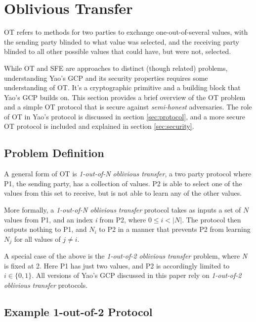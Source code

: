 \section{Oblivious Transfer}
\label{sec:ot}

\ac{OT} refers to methods for two parties to exchange one-out-of-several values, with the sending party blinded to what value was selected, and the receiving party blinded to all other possible values that could have, but were not, selected.

While \ac{OT} and \ac{SFE} are approaches to distinct (though related) problems, understanding Yao's \ac{GCP} and its security properties requires some understanding of \ac{OT}. It's a cryptographic primitive and a building block that Yao's \ac{GCP} builds on.  This section provides a brief overview of the \ac{OT} problem and a simple \ac{OT} protocol that is secure against \emph{semi-honest} adversaries. The role of \ac{OT} in Yao's protocol is discussed in section \ref{sec:protocol}, and a more secure \ac{OT} protocol is included and explained in section \ref{sec:security}.

\subsection{Problem Definition}

A general form of \ac{OT} is \emph{1-out-of-N oblivious transfer}, a two party protocol where \ac{P1}, the sending party, has a collection of values. \ac{P2} is able to select one of the values from this set to receive, but is not able to learn any of the other values.

More formally, a \emph{1-out-of-N oblivious transfer} protocol takes as inputs a set of $N$ values from \ac{P1}, and an index \emph{i} from \ac{P2}, where $0 \leq i < |N|$. The protocol then outputs nothing to \ac{P1}, and $N_i$ to \ac{P2} in a manner that prevents \ac{P2} from learning $N_j$ for all values of $j \neq i$.

A special case of the above is the \emph{1-out-of-2 oblivious transfer} problem, where \emph{N} is fixed at 2.  Here \ac{P1} has just two values, and \ac{P2} is accordingly limited to $i \in \{0, 1\}$.  All versions of Yao's \ac{GCP} discussed in this paper rely on \emph{1-out-of-2 oblivious transfer} protocols.

\subsection{Example 1-out-of-2 Protocol}

